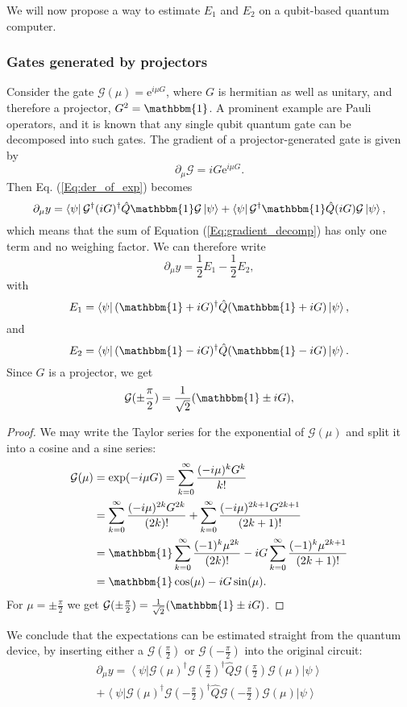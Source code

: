 \documentclass[aps,pra,10pt,twocolumn,groupedaddress,nofootinbib]{revtex4-1}
\theoremstyle{plain}
\newcommand{\I}{\mathbbm{1}} %
\newcommand{\ket}[1]{\ensuremath{\left| #1 \right \rangle}}
\newcommand{\bra}[1]{\ensuremath{\left \langle #1 \right |}}
\newcommand{\e}{\mathrm{e}}
\newcommand{\G}{\mathcal{G}}
\begin{document}
We will now propose a way to estimate $E_1$ and $E_2$ on a qubit-based quantum computer.\\

\subsubsection{Gates generated by projectors}
Consider the gate $\G(\mu) = \e^{i \mu G}$, where $G$ is hermitian as well as unitary, and therefore a projector, $G^2 = \mathbbm{1}$. A prominent example are Pauli operators, and it is known that any single qubit quantum gate can be decomposed into such gates. The gradient of a projector-generated gate is given by
\[ \partial_{\mu} \G = i G \e^{i \mu G}.    \]
Then Eq. (\ref{Eq:der_of_exp}) becomes
\[ \partial_{\mu} y =   \bra{\psi} \G^{\dagger} (iG)^{\dagger}  \hat{Q} \mathbbm{1} \G \ket{\psi} + \bra{\psi} \G^{\dagger} \mathbbm{1}  \hat{Q} (iG) \G \ket{\psi} , \]
which means that the sum of Equation (\ref{Eq:gradient_decomp}) has only one term and no weighing factor. We can therefore write
\[ \partial_{\mu} y = \frac{1}{2}E_1 - \frac{1}{2} E_2, \]
with
\[E_1 = \bra{\psi} (\mathbbm{1} + iG)^{\dagger} \hat{Q} (\mathbbm{1} + iG) \ket{\psi},\]
and
\[E_2= \bra{\psi}(\mathbbm{1} - iG)^{\dagger}  \hat{Q} (\mathbbm{1} - iG) \ket{\psi}. \]
Since $G$ is a projector, we get
\begin{equation}
	\G(\pm \frac{\pi}{2}) = \frac{1}{\sqrt{2}}(\I \pm iG),
	\label{Eq:Pauli_equality}
\end{equation}

\begin{proof}
We may write the Taylor series for the exponential of $\G(\mu)$
and split it into a cosine and a sine series:
\begin{align*}
\mathcal{G}(\mu) &= \exp(-i\mu G) = \sum_{k=0}^\infty \frac{(-i\mu)^k G^k}{k!}\\
&=
\sum_{k=0}^\infty \frac{(-i\mu)^{2k} G^{2k}}{(2k)!}
+\sum_{k=0}^\infty \frac{(-i\mu)^{2k+1} G^{2k+1}}{(2k+1)!}\\
&=
\I \sum_{k=0}^\infty \frac{(-1)^{k} \mu^{2k}}{(2k)!}
-i G \sum_{k=0}^\infty \frac{(-1)^{k} \mu^{2k+1}}{(2k+1)!}\\
&=
\I \cos(\mu)
-i G \sin(\mu).
\end{align*}
For $\mu = \pm \frac{\pi}{2}$ we get $\G(\pm \frac{\pi}{2}) = \frac{1}{\sqrt{2}}(\I \pm iG)$.
\end{proof}

We conclude that the expectations can be estimated straight from the quantum device, by inserting either a $\G(\frac{\pi}{2})$ or $\G(-\frac{\pi}{2})$ into the original circuit:
\begin{multline*}
	\partial_{\mu} y =   \bra{\psi} \G\left(\mu \right)^{\dagger} \G \left(\frac{\pi}{2} \right)^{\dagger}  \hat{Q} \G \left(\frac{\pi}{2} \right) \G\left(\mu \right) \ket{\psi} \\ + \bra{\psi} \G\left(\mu \right)^{\dagger} \G \left(- \frac{\pi}{2} \right)^{\dagger} \hat{Q} \G \left(-\frac{\pi}{2} \right) \G\left(\mu \right) \ket{\psi}
\end{multline*}
\end{document}
